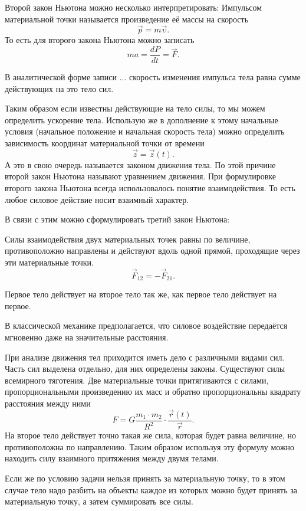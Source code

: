 Второй закон Ньютона можно несколько интерпретировать:
Импульсом материальной точки называется произведение её массы на скорость \[
  \vec{p} = m \vec{\upsilon}
.\] То есть для второго закона Ньютона можно записать \[
  m a = \frac{d P}{d t} = \vec{F}
.\]

В аналитической форме записи ... скорость изменения импульса тела равна сумме
действующих на это тело сил.

Таким образом если известны действующие на тело силы, то мы можем определить
ускорение тела. Использую же в дополнение к этому начальные условия (начальное
положение и начальная скорость тела) можно определить зависимость координат
материальной точки от времени \[
  \vec{z} = \vec{z}(t)
.\] А это в свою очередь называется законом движения тела. По этой причине
второй закон Ньютона называют уравнением движения. При формулировке второго
закона Ньютона всегда использовалось понятие взаимодействия. То есть любое
силовое действие носит взаимный характер.

В связи с этим можно сформулировать третий закон Ньютона:
\begin{theorem}\label{thrm:third-nuton}
  Силы взаимодействия двух материальных точек равны по величине, противоположно
  направлены и действуют вдоль одной прямой, проходящие через эти материальные
  точки.\[
    \vec{F}_{12} = - \vec{F}_{21}
  .\]
\end{theorem}

Первое тело действует на второе тело так же, как первое тело действует на
первое.

\begin{corollary}
  В классической механике предполагается, что силовое воздействие передаётся
  мгновенно даже на значительные расстояния.
\end{corollary}

При анализе движения тел приходится иметь дело с различными видами сил. Часть
сил выделена отдельно, для них определены законы. Существуют силы всемирного
тяготения. Две материальные точки притягиваются с силами, пропорциональными
произведению их масс и обратно пропорциональны квадрату расстояния между ними
\[
  F = G \frac{m_1 \cdot m_2}{R^2} \cdot \frac{\vec{r}(t)}{\vec{r}}
.\] На второе тело действует точно такая же сила, которая будет равна
величине, но противоположна по направлению. Таким образом используя эту
формулу можно находить силу взаимного притяжения между двумя телами.

Если же по условию задачи нельзя принять за материальную точку, то в этом
случае тело надо разбить на объекты каждое из которых можно будет принять за
материальную точку, а затем суммировать все силы.

